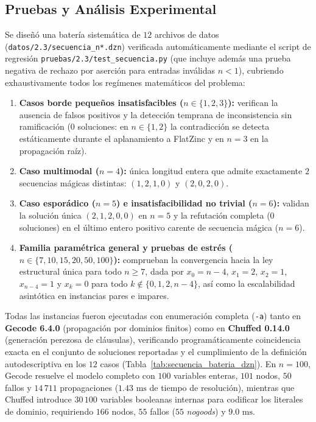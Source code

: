 \subsection{Pruebas y Análisis Experimental}

Se diseñó una batería sistemática de $12$ archivos de datos (\texttt{datos/2.3/secuencia\_n*.dzn}) verificada automáticamente mediante el script de regresión \texttt{pruebas/2.3/test\_secuencia.py} (que incluye además una prueba negativa de rechazo por aserción para entradas inválidas $n < 1$), cubriendo exhaustivamente todos los regímenes matemáticos del problema:
\begin{enumerate}
    \item \textbf{Casos borde pequeños insatisfacibles ($n \in \{1, 2, 3\}$):} verifican la ausencia de falsos positivos y la detección temprana de inconsistencia sin ramificación ($0$ soluciones: en $n \in \{1, 2\}$ la contradicción se detecta estáticamente durante el aplanamiento a FlatZinc y en $n = 3$ en la propagación raíz).
    \item \textbf{Caso multimodal ($n = 4$):} única longitud entera que admite exactamente $2$ secuencias mágicas distintas: $(1, 2, 1, 0)$ y $(2, 0, 2, 0)$.
    \item \textbf{Caso esporádico ($n = 5$) e insatisfacibilidad no trivial ($n = 6$):} validan la solución única $(2, 1, 2, 0, 0)$ en $n=5$ y la refutación completa ($0$ soluciones) en el último entero positivo carente de secuencia mágica ($n=6$).
    \item \textbf{Familia paramétrica general y pruebas de estrés ($n \in \{7, 10, 15, 20, 50, 100\}$):} comprueban la convergencia hacia la ley estructural única para todo $n \ge 7$, dada por $x_0 = n - 4$, $x_1 = 2$, $x_2 = 1$, $x_{n-4} = 1$ y $x_k = 0$ para todo $k \notin \{0, 1, 2, n-4\}$, así como la escalabilidad asintótica en instancias pares e impares.
\end{enumerate}

Todas las instancias fueron ejecutadas con enumeración completa (\texttt{-a}) tanto en \textbf{Gecode 6.4.0} (propagación por dominios finitos) como en \textbf{Chuffed 0.14.0} (generación perezosa de cláusulas), verificando programáticamente coincidencia exacta en el conjunto de soluciones reportadas y el cumplimiento de la definición autodescriptiva en los $12$ casos (Tabla~\ref{tab:secuencia_bateria_dzn}). En $n=100$, Gecode resuelve el modelo completo con $100$ variables enteras, $101$ nodos, $50$ fallos y $14\,711$ propagaciones ($1.43\text{ ms}$ de tiempo de resolución), mientras que Chuffed introduce $30\,100$ variables booleanas internas para codificar los literales de dominio, requiriendo $166$ nodos, $55$ fallos ($55$ \emph{nogoods}) y $9.0\text{ ms}$.

